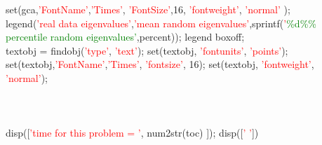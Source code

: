 \hspace{1mm}\indent \indent \indent \indent \indent \indent \indent \indent \indent \indent \indent \indent \indent \indent \indent \indent set(gca,\textcolor{red}{'FontName'},\textcolor{red}{'Times'}, \textcolor{red}{'FontSize'},16, \textcolor{red}{'fontweight'}, \textcolor{red}{'normal'} ); \\ 
\hspace{1mm}\indent \indent \indent \indent \indent \indent \indent \indent \indent \indent \indent \indent \indent \indent \indent \indent legend(\textcolor{red}{'real data eigenvalues'},\textcolor{red}{'mean random eigenvalues'},sprintf(\textcolor{red}{'}\textcolor{green}{\%d}\textcolor{green}{\%}\textcolor{green}{\% percentile random eigenvalues'},percent)); legend boxoff;  \\ 
\hspace{1mm}\indent \indent \indent \indent \indent \indent \indent \indent \indent \indent \indent \indent \indent \indent \indent \indent textobj = findobj(\textcolor{red}{'type'}, \textcolor{red}{'text'}); set(textobj, \textcolor{red}{'fontunits'}, \textcolor{red}{'points'});  \\ 
\hspace{1mm}\indent \indent \indent \indent \indent \indent \indent \indent \indent \indent \indent \indent \indent \indent \indent \indent set(textobj,\textcolor{red}{'FontName'},\textcolor{red}{'Times'}, \textcolor{red}{'fontsize'}, 16); set(textobj, \textcolor{red}{'fontweight'}, \textcolor{red}{'normal'}); \\ 
\hspace{1mm}\indent \indent \indent \indent \indent \indent \indent \indent \indent \indent \indent \indent \indent \indent \indent \indent  \\ 
\hspace{1mm}\indent \indent \indent \indent \indent \indent \indent \indent \indent \indent \indent \indent \indent \indent \indent \indent  \\ 
\hspace{1mm}\indent \indent \indent \indent \indent \indent \indent \indent \indent \indent \indent \indent \indent \indent \indent \indent  \\ 
\hspace{1mm}\indent \indent \indent \indent \indent \indent \indent \indent \indent \indent \indent \indent \indent \indent \indent \indent disp([\textcolor{red}{'time for this problem = '}, num2str(toc) ]); disp([\textcolor{red}{' '}]) \\ 
\hspace{1mm}\indent \indent \indent \indent \indent \indent \indent \indent \indent \indent \indent \indent \indent \indent \indent \indent  \\ 
